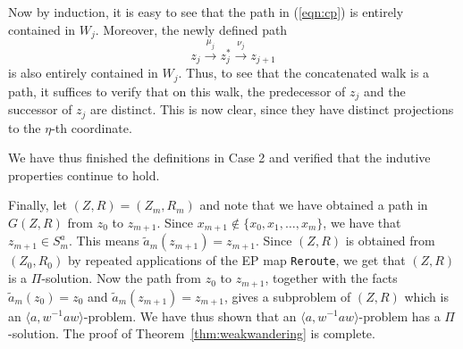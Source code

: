 \documentclass[10pt,a4paper]{amsart}
\theoremstyle{definition}
\theoremstyle{definition}
\numberwithin{equation}{section}
\begin{document}
Now by induction, it is easy to see that the path in (\ref{eqn:cp}) is entirely contained in $W_j$. Moreover, the newly defined path 
$$ z_j\stackrel{\mu_j}{\longrightarrow} z_j^*\stackrel{\nu_j}{\longrightarrow} z_{j+1} $$
is also entirely contained in $W_j$. Thus, to see that the concatenated walk is a path, it suffices to verify that on this walk, the predecessor of $z_j$ and the successor of $z_j$ are distinct. This is now clear, since they have distinct projections to the $\eta$-th coordinate. 

We have thus finished the definitions in Case 2 and verified that the indutive properties continue to hold. 

Finally, let $(Z, R)=(Z_m, R_m)$ and note that we have obtained a path in $G(Z, R)$ from $z_0$ to $z_{m+1}$. Since 
$x_{m+1}\not\in \{x_0, x_1, \dots, x_m\}$, we have that $z_{m+1}\in S_m^a$. This means $\tilde{a}_m(z_{m+1})=z_{m+1}$. Since $(Z, R)$ is obtained from $(Z_0, R_0)$ by repeated applications of the EP map {\tt Reroute}, we get that $(Z, R)$ is a $\Pi$-solution. Now the path from $z_0$ to $z_{m+1}$, together with the facts $\tilde{a}_m(z_0)=z_0$ and $\tilde{a}_m(z_{m+1})=z_{m+1}$, gives a subproblem of $(Z, R)$ which is an $\langle a, w^{-1}aw\rangle$-problem. We have thus shown that an $\langle a, w^{-1}aw\rangle$-problem has a $\Pi$-solution. The proof of Theorem~\ref{thm:weakwandering} is complete.
\end{document}
